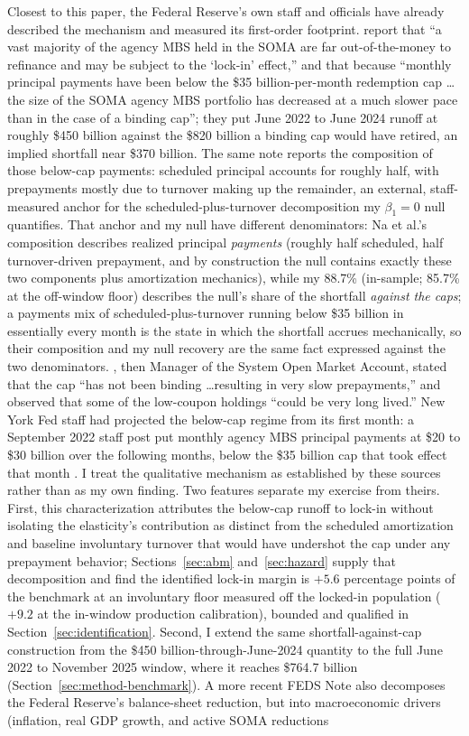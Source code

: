 \documentclass[12pt]{article}
\begin{document}
Closest to this paper, the Federal Reserve's own staff and officials have already described the mechanism and measured its first-order footprint. \citet{na2024} report that ``a vast majority of the agency MBS held in the SOMA are far out-of-the-money to refinance and may be subject to the `lock-in' effect,'' and that because ``monthly principal payments have been below the \$35 billion-per-month redemption cap \ldots the size of the SOMA agency MBS portfolio has decreased at a much slower pace than in the case of a binding cap''; they put June 2022 to June 2024 runoff at roughly \$450 billion against the \$820 billion a binding cap would have retired, an implied shortfall near \$370 billion. The same note reports the composition of those below-cap payments: scheduled principal accounts for roughly half, with prepayments mostly due to turnover making up the remainder, an external, staff-measured anchor for the scheduled-plus-turnover decomposition my $\beta_1 = 0$ null quantifies. That anchor and my null have different denominators: Na et al.'s composition describes realized principal \emph{payments} (roughly half scheduled, half turnover-driven prepayment, and by construction the null contains exactly these two components plus amortization mechanics), while my 88.7\% (in-sample; 85.7\% at the off-window floor) describes the null's share of the shortfall \emph{against the caps}; a payments mix of scheduled-plus-turnover running below \$35 billion in essentially every month is the state in which the shortfall accrues mechanically, so their composition and my null recovery are the same fact expressed against the two denominators. \citet{perli2024}, then Manager of the System Open Market Account, stated that the cap ``has not been binding \ldots resulting in very slow prepayments,'' and \citet{hammack2025} observed that some of the low-coupon holdings ``could be very long lived.'' New York Fed staff had projected the below-cap regime from its first month: a September 2022 staff post put monthly agency MBS principal payments at \$20 to \$30 billion over the following months, below the \$35 billion cap that took effect that month \citep{nyfed2022}. I treat the qualitative mechanism as established by these sources rather than as my own finding. Two features separate my exercise from theirs. First, this characterization attributes the below-cap runoff to lock-in without isolating the elasticity's contribution as distinct from the scheduled amortization and baseline involuntary turnover that would have undershot the cap under any prepayment behavior; Sections~\ref{sec:abm} and~\ref{sec:hazard} supply that decomposition and find the identified lock-in margin is $+5.6$ percentage points of the benchmark at an involuntary floor measured off the locked-in population ($+9.2$ at the in-window production calibration), bounded and qualified in Section~\ref{sec:identification}. Second, I extend the same shortfall-against-cap construction from the \$450 billion-through-June-2024 quantity to the full June 2022 to November 2025 window, where it reaches \$764.7 billion (Section~\ref{sec:method-benchmark}). A more recent \citet{eyal2026} FEDS Note also decomposes the Federal Reserve's balance-sheet reduction, but into macroeconomic drivers (inflation, real GDP growth, and active SOMA reductions 
\end{document}

